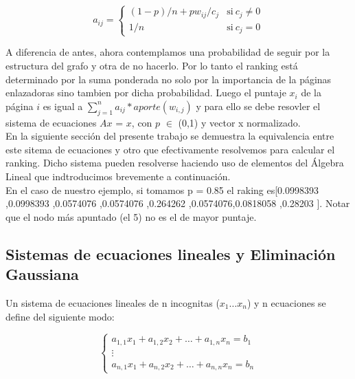     \begin{equation}
        a_{ij} = \left\{
                \begin{array}{ll}
                     (1-p)/n + p w_{ij}/c_{j} & \mathrm{si\ } c_j \neq 0 \\
                     1/n    & \mathrm{si\ } c_j = 0
                \end{array}
            \right.
    \end{equation} 

A diferencia de antes, ahora contemplamos una probabilidad de seguir por la estructura del grafo y otra de no hacerlo. Por lo tanto el ranking está determinado por la suma ponderada no solo por la importancia de la páginas enlazadoras sino tambien por dicha probabilidad. Luego el puntaje $x_{i}$ de la página $i$ es igual a $\sum_{j=1}^{n} a_{ij} * aporte (w_{i,j})$ y para ello se debe resovler el sistema de ecuaciones $Ax$ = $x$, con $p$ $\in$ (0,1) y vector x normalizado.\\

En la siguiente sección del presente trabajo se demuestra la equivalencia entre este sitema de ecuaciones y otro que efectivamente resolvemos para calcular el ranking. Dicho sistema pueden resolverse haciendo uso de elementos del Álgebra Lineal que indtroducimos brevemente a continuación. \\

En el caso de nuestro ejemplo, si tomamos p = 0.85 el raking es[0.0998393 ,0.0998393 ,0.0574076 ,0.0574076 ,0.264262 ,0.0574076,0.0818058 ,0.28203 ]. Notar que el nodo más apuntado (el 5) no es el de mayor puntaje. \\

\subsection{Sistemas de ecuaciones lineales y Eliminación Gaussiana}

Un sistema de ecuaciones lineales de n incognitas ($x_{1} \dots x_{n}$) y n ecuaciones se define del siguiente modo:

    \begin{equation*}
     	\left\{
                \begin{array}{l}
                
                     a_{1,1}x_{1} + a_{1,2}x_{2} + \dots + a_{1,n}x_{n} =  b_{1} \\
                     \vdots \\ 
                    a_{n,1}x_{1} + a_{n,2}x_{2} + \dots + a_{n,n}x_{n} =  b_{n} 
                    
                \end{array}
       \right.
    \end{equation*}  
    
